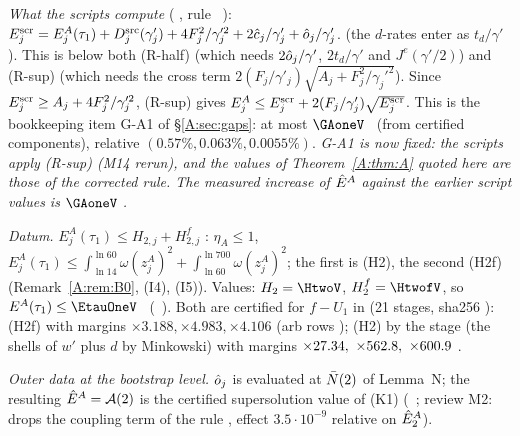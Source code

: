 \documentclass[11pt]{article}
\begin{document}
\noindent\emph{What the scripts compute} ( , rule \SA\ ): $E^{\rm scr}_j=E^A_j(\tau_1)+D^{\rm src}_j(\gamma'_j)+4F_j^2/\gamma_j'^2+2\hat c_j/\gamma'_j+\hat o_j/\gamma'_j$. (the $d$-rates enter as $t_d/\gamma'$). This is below both (R-half) (which needs $2\hat o_j/\gamma'$, $2t_d/\gamma'$ and $J^e(\gamma'/2)$) and (R-sup) (which needs the cross term $2(F_j/\gamma'_j)\sqrt{A_j+F_j^2/\gamma_j'^2}$). Since $E^{\rm scr}_j\ge A_j+4F_j^2/\gamma_j'^2$, (R-sup) gives $E^A_j\le E^{\rm scr}_j+2(F_j/\gamma'_j)\sqrt{E^{\rm scr}_j}$. This is the bookkeeping item G-A1 of \S\ref{A:sec:gaps}: at most $\GAoneV$ \tE\ (from certified components), relative $(0.57\%,0.063\%,0.0055\%)$. \emph{G-A1 is now fixed: the scripts apply (R-sup) (M14 rerun), and the values of Theorem~\ref{A:thm:A} quoted here are those of the corrected rule. The measured increase of $\hat E^A$ against the earlier script values is $\GAoneV$ \tE.}

\emph{Datum.} $E^A_j(\tau_1)\le H_{2,j}+H^f_{2,j}$ \tP: $\eta_A\le1$, $E^A_j(\tau_1)\le\int_{\ln14}^{\ln60}\omega(z^A_j)^2+\int_{\ln60}^{\ln700}\omega(z^A_j)^2$; the first is (H2), the second (H2f) (Remark~\ref{A:rem:B0}, (I4), (I5)). Values: $H_2=\HtwoV$, $H^f_2=\HtwofV$, so $E^A(\tau_1)\le\EtauOneV$ \tH\ (\SA\ ). Both are certified for $f-U_1$ in  (21 stages, sha256 ): (H2f) with margins $\times3.188,\times4.983,\times4.106$ (arb rows ); (H2) by the stage  (the shells of $w'$ plus $d$ by Minkowski) with margins $\times27.34,\ \times562.8,\ \times600.9$ \tC\tB.

\emph{Outer data at the bootstrap level.} $\hat o_j$ is evaluated at $\bar N(2)$ of Lemma~N; the resulting $\hat E^A=\mathcal A(2)$ is the certified supersolution value of  (K1) (\SU\ ; review M2:  drops the coupling term of the rule , effect $3.5\cdot10^{-9}$ relative on $\hat E^A_2$).
\end{document}
